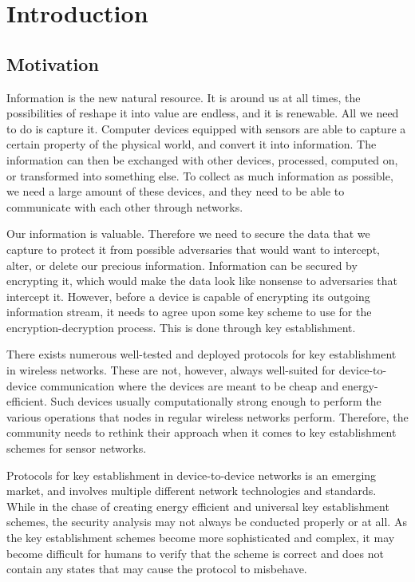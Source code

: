 \chapter{Introduction}
\label{chp:introduction} 


\section{Motivation}


Information is the new natural resource. It is around us at all times, the possibilities of reshape it into value are endless, and it is renewable. All we need to do is capture it. Computer devices equipped with sensors are able to capture a certain property of the physical world, and convert it into information. The information can then be exchanged with other devices, processed, computed on, or transformed into something else. To collect as much information as possible, we need a large amount of these devices, and they need to be able to communicate with each other through networks. 

Our information is valuable. Therefore we need to secure the data that we capture to protect it from possible adversaries that would want to intercept, alter, or delete our precious information. Information can be secured by encrypting it, which would make the data look like nonsense to adversaries that intercept it. However, before a device is capable of encrypting its outgoing information stream, it needs to agree upon some key scheme to use for the encryption-decryption process. This is done through key establishment. 

There exists numerous well-tested and deployed protocols for key establishment in wireless networks. These are not, however, always well-suited for device-to-device communication where the devices are meant to be cheap and energy-efficient. Such devices usually computationally strong enough to perform the various operations that nodes in regular wireless networks perform. Therefore, the community needs to rethink their approach when it comes to key establishment schemes for sensor networks.

Protocols for key establishment in device-to-device networks is an emerging market, and involves multiple different network technologies and standards. While in the chase of creating energy efficient and universal key establishment schemes, the security analysis may not always be conducted properly or at all. As the key establishment schemes become more sophisticated and complex, it may become difficult for humans to verify that the scheme is correct and does not contain any states that may cause the protocol to misbehave.

